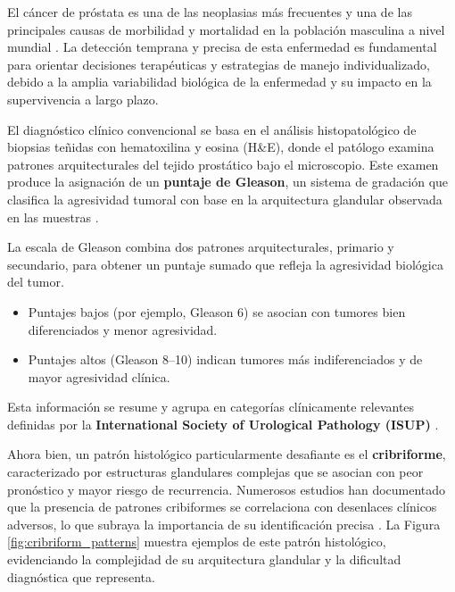 
El cáncer de próstata es una de las neoplasias más frecuentes y una de las principales causas de morbilidad y mortalidad en la población masculina a nivel mundial \cite{MinSalud_2025} \cite{SungH_2021_Global}. La detección temprana y precisa de esta enfermedad es fundamental para orientar decisiones terapéuticas y estrategias de manejo individualizado, debido a la amplia variabilidad biológica de la enfermedad y su impacto en la supervivencia a largo plazo.\newline

El diagnóstico clínico convencional se basa en el análisis histopatológico de biopsias teñidas con hematoxilina y eosina (H\&E), donde el patólogo examina patrones arquitecturales del tejido prostático bajo el microscopio.  
Este examen produce la asignación de un \textbf{puntaje de Gleason}, un sistema de gradación que clasifica la agresividad tumoral con base en la arquitectura glandular observada en las muestras \cite{Brett_2016} \cite{Ozkan2016}. \newline

La escala de Gleason combina dos patrones arquitecturales, primario y secundario, para obtener un puntaje sumado que refleja la agresividad biológica del tumor.  
\begin{itemize}
    \item Puntajes bajos (por ejemplo, Gleason 6) se asocian con tumores bien diferenciados y menor agresividad.  
    \item Puntajes altos (Gleason 8--10) indican tumores más indiferenciados y de mayor agresividad clínica.  
\end{itemize}

Esta información se resume y agrupa en categorías clínicamente relevantes definidas por la \textbf{International Society of Urological Pathology (ISUP)} \cite{SILVARODRIGUEZ2020105637} \cite{epstein2016gleason}.\newline

Ahora bien, un patrón histológico particularmente desafiante es el \textbf{cribriforme}, caracterizado por estructuras glandulares complejas que se asocian con peor pronóstico y mayor riesgo de recurrencia. Numerosos estudios han documentado que la presencia de patrones cribiformes se correlaciona con desenlaces clínicos adversos, lo que subraya la importancia de su identificación precisa \cite{SILVARODRIGUEZ2020105637}. La Figura \ref{fig:cribriform_patterns} muestra ejemplos de este patrón histológico, evidenciando la complejidad de su arquitectura glandular y la dificultad diagnóstica que representa.

